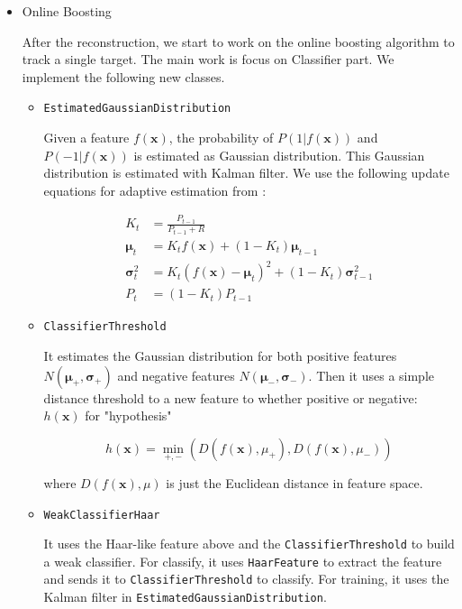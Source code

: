 \documentclass[a4paper]{article}
\begin{document}
\begin{enumerate}
\begin{itemize}
\item Online Boosting

After the reconstruction, we start to work on the online boosting algorithm to track a single target. The main work is focus on Classifier part. We implement the following new classes.

\begin{itemize}

\item \lstinline{EstimatedGaussianDistribution}

Given a feature $f(\mathbf{x})$, the probability of $P(1|f(\mathbf{x}))$ and $P(-1|f(\mathbf{x}))$ is estimated as Gaussian distribution\cite{Grabner:2006:OBV:1153170.1153451}. This Gaussian distribution is estimated with Kalman filter\cite{Welch:1995:IKF:897831}. We use the following update equations for adaptive estimation from \cite{Grabner:2006:OBV:1153170.1153451}:

\begin{subequations}
\begin{align}
K_{t}&=\frac{P_{t-1}}{P_{t-1}+R}\\
\mathbf{\mu}_{t}&=K_{t}f(\mathbf{x})+(1-K_{t})\mathbf{\mu}_{t-1}\\
\mathbf{\sigma}_{t}^{2}&=K_{t}(f(\mathbf{x})-\mathbf{\mu}_{t})^{2}+(1-K_{t})\mathbf{\sigma}_{t-1}^{2}\\
P_{t}&=(1-K_{t})P_{t-1}
\end{align}
\end{subequations}

\item \lstinline{ClassifierThreshold}

It estimates the Gaussian distribution for both positive features $N(\mathbf{\mu_{+}}, \mathbf{\sigma_{+}})$ and negative features $N(\mathbf{\mu_{-}}, \mathbf{\sigma_{-}})$. Then it uses a simple distance threshold to a new feature to whether positive or negative: $h(\mathbf{x})$ for "hypothesis"

\begin{equation}
h(\mathbf{x})=\min_{+, -}(D(f(\mathbf{x}), \mu_{+}), D(f(\mathbf{x}), \mu_{-}))
\end{equation}

where $D(f(\mathbf{x}), \mu)$ is just the Euclidean distance in feature space.

\item \lstinline{WeakClassifierHaar}

It uses the Haar-like feature above and the \lstinline{ClassifierThreshold} to build a weak classifier. For classify, it uses \lstinline{HaarFeature} to extract the feature and sends it to \lstinline{ClassifierThreshold} to classify. For training, it uses the Kalman filter in \lstinline{EstimatedGaussianDistribution}.


\end{itemize}
\end{itemize}
\end{enumerate}
\end{document}
